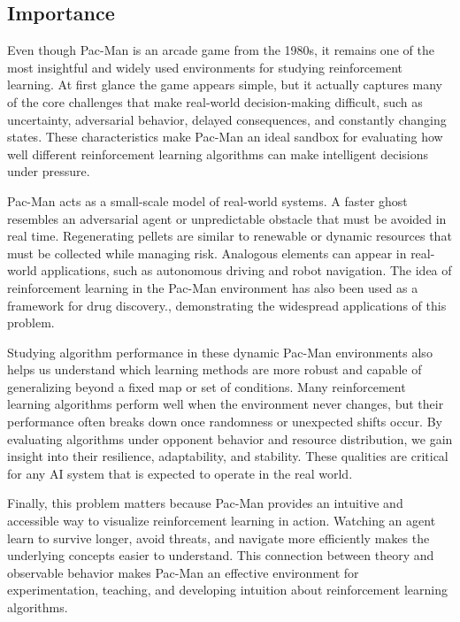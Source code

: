 \documentclass{article}
\begin{document}
\subsection{Importance}

Even though Pac-Man is an arcade game from the 1980s, it remains one of the most insightful and widely used environments for studying reinforcement learning. At first glance the game appears simple, but it actually captures many of the core challenges that make real-world decision-making difficult, such as uncertainty, adversarial behavior, delayed consequences, and constantly changing states. These characteristics make Pac-Man an ideal sandbox for evaluating how well different reinforcement learning algorithms can make intelligent decisions under pressure.

Pac-Man acts as a small-scale model of real-world systems. A faster ghost resembles an adversarial agent or unpredictable obstacle that must be avoided in real time. Regenerating pellets are similar to renewable or dynamic resources that must be collected while managing risk. Analogous elements can appear in real-world applications, such as autonomous driving and robot navigation. The idea of reinforcement learning in the Pac-Man environment has also been used as a framework for drug discovery.\citep{amkamgari}, demonstrating the widespread applications of this problem. 

Studying algorithm performance in these dynamic Pac-Man environments also helps us understand which learning methods are more robust and capable of generalizing beyond a fixed map or set of conditions. Many reinforcement learning algorithms perform well when the environment never changes, but their performance often breaks down once randomness or unexpected shifts occur. By evaluating algorithms under opponent behavior and resource distribution, we gain insight into their resilience, adaptability, and stability. These qualities are critical for any AI system that is expected to operate in the real world.

Finally, this problem matters because Pac-Man provides an intuitive and accessible way to visualize reinforcement learning in action. Watching an agent learn to survive longer, avoid threats, and navigate more efficiently makes the underlying concepts easier to understand. This connection between theory and observable behavior makes Pac-Man an effective environment for experimentation, teaching, and developing intuition about reinforcement learning algorithms.
\end{document}
